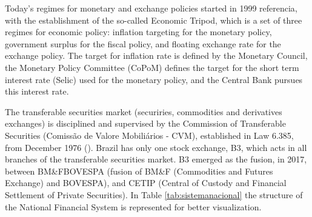 \documentclass[cic,tc, english]{iiufrgs}
\begin{document}
    Today's regimes for monetary and exchange policies started in 1999 {referencia}, with the establishment of the so-called Economic Tripod, which is a set of three regimes for economic policy: inflation targeting for the monetary policy, government surplus for the fiscal policy, and floating exchange rate for the exchange policy. The target for inflation rate is defined by the Monetary Council, the Monetary Policy Committee (CoPoM) defines the target for the short term interest rate (Selic) used for the monetary policy, and the Central Bank pursues this interest rate.

    The transferable securities market (securiries, commodities and derivatives exchanges) is disciplined and supervised by the Commission of Transferable Securities (Comissão de Valore Mobiliários - CVM), established in Law 6.385, from December 1976 (\citet{lei6385}). Brazil has only one stock exchange, B3, which acts in all branches of the transferable securities market. B3 emerged as the fusion, in 2017, between BM\&FBOVESPA (fusion of BM\&F (Commodities and Futures Exchange) and BOVESPA), and CETIP (Central of Custody and Financial Settlement of Private Securities).  In Table \ref{tab:sistemanacional} the structure of the National Financial System is represented for better visualization.
\end{document}
